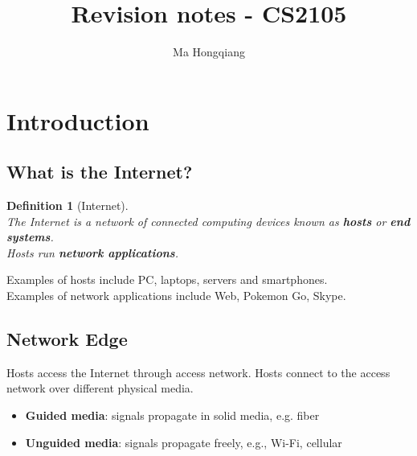 \documentclass[12pt]{article}
\newtheorem{definition}{Definition}[section]
\theoremstyle{definition}
\begin{document}
\title{Revision notes - CS2105}
\author{Ma Hongqiang}
\maketitle
\tableofcontents

\clearpage
\section{Introduction}
\subsection{What is the Internet?}
\begin{definition}[Internet]
\hfill\\\normalfont The \textit{Internet} is a network of connected computing devices known as \textbf{hosts} or \textbf{end systems}.\\
Hosts run \textbf{network applications}.
\end{definition}
Examples of hosts include PC, laptops, servers and smartphones.\\
Examples of network applications include Web, Pokemon Go, Skype.
\subsection{Network Edge}
Hosts access the Internet through access network. Hosts connect to the access network over different physical media.
\begin{itemize}
  \item \textbf{Guided media}: signals propagate in solid media, e.g. fiber
  \item \textbf{Unguided media}: signals propagate freely, e.g., Wi-Fi, cellular
\end{itemize}
\end{document}

